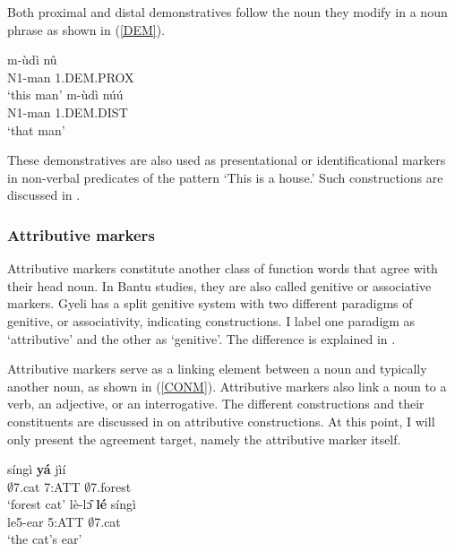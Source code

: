 \noindent Both proximal and distal demonstratives follow the noun they modify in a noun phrase as shown in (\ref{DEM}).

\begin{exe}
\ex\label{DEM}
\begin{xlist}
\ex \label{DEM1}
  \gll     m-ùdì nû \\
                N1-man 1.DEM.PROX \\
    \trans `this man'
\ex\label{DEM2}
 \gll     m-ùdì núú \\
                N1-man 1.DEM.DIST \\
    \trans `that man'
\end {xlist}
\end {exe} 

These demonstratives are also used as presentational or identificational markers in non-verbal predicates of the pattern `This is a house.' Such constructions are discussed in .





\subsubsection{Attributive markers}
\label{sec:ATT}

Attributive markers constitute another class of function words that agree with their head noun. In Bantu studies, they are also called genitive or associative markers. Gyeli has a split genitive system with two different paradigms of genitive, or associativity, indicating constructions. I label one paradigm as `attributive' and the other as `genitive'.  The difference is explained in .


Attributive markers serve as a linking element between a noun and typically another noun, as shown in (\ref{CONM}). %
Attributive markers also link a noun to a verb, an adjective, or an interrogative. The different constructions and their constituents are discussed in  on attributive constructions. At this point, I will only present the agreement target, namely the attributive marker itself.

\begin{exe}
\ex\label{CONM}
\begin{xlist}
\ex \label{CONM1}
  \gll     síngì {\bfseries yá} jìí \\
                $\emptyset$7.cat 7:ATT $\emptyset$7.forest \\
    \trans `forest cat'
\ex\label{CONM2}
 \gll    lè-lɔ̂ {\bfseries lé} síngì \\
                le5-ear 5:ATT $\emptyset$7.cat \\
    \trans `the cat's ear'
\end {xlist}
\end {exe}

